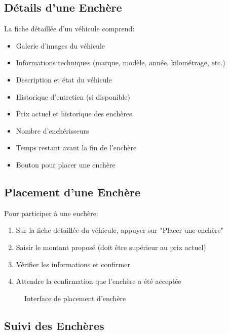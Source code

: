 \subsection{Détails d'une Enchère}

La fiche détaillée d'un véhicule comprend:

\begin{itemize}
    \item Galerie d'images du véhicule
    \item Informations techniques (marque, modèle, année, kilométrage, etc.)
    \item Description et état du véhicule
    \item Historique d'entretien (si disponible)
    \item Prix actuel et historique des enchères
    \item Nombre d'enchérisseurs
    \item Temps restant avant la fin de l'enchère
    \item Bouton pour placer une enchère
\end{itemize}

\subsection{Placement d'une Enchère}

Pour participer à une enchère:

\begin{enumerate}
    \item Sur la fiche détaillée du véhicule, appuyer sur "Placer une enchère"
    \item Saisir le montant proposé (doit être supérieur au prix actuel)
    \item Vérifier les informations et confirmer
    \item Attendre la confirmation que l'enchère a été acceptée
\end{enumerate}

\begin{figure}[h]
    \centering
    \caption{Interface de placement d'enchère}
    \label{fig:interface-enchere}
\end{figure}

\subsection{Suivi des Enchères}

